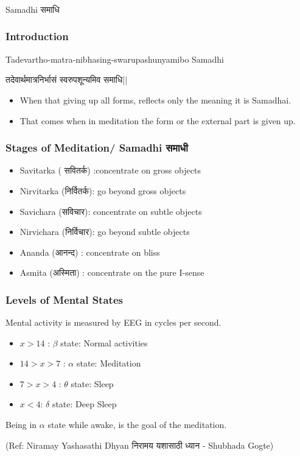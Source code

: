 \begin{frame}[fragile]\frametitle{}
\begin{center}
{\Large Samadhi समाधि}
\end{center}
\end{frame}

\begin{frame}[fragile]\frametitle{Introduction}

Tadevartho-matra-nibhasing-swarupashunyamibo Samadhi

तदेवार्थमात्रनिर्भासं स्वरुपशून्यमिव समाधि||

	\begin{itemize}
	\item When that giving up all forms, 
reflects  only  the  meaning  it  is 
Samadhai. 
	\item That comes when in 
meditation  the  form  or  the 
external part is given up.
	\end{itemize}

\end{frame}


\begin{frame}[fragile]\frametitle{Stages of Meditation/ Samadhi समाधी}


	\begin{itemize}
	\item Savitarka ( सवितर्क) :concentrate on gross objects
	\item  Nirvitarka (निर्वितर्क): go beyond gross objects
	\item  Savichara (सविचार): concentrate on subtle objects
	\item  Nirvichara (निर्विचार): go beyond subtle objects
	\item  Ananda (आनन्द) : concentrate on bliss
	\item  Asmita (अस्मिता) : concentrate on the pure I-sense
	\end{itemize}

\end{frame}

\begin{frame}[fragile]\frametitle{Levels of Mental States}
Mental activity is measured by EEG in cycles per second.

	\begin{itemize}
	\item $x > 14$ : $\beta$ state: Normal activities
	\item $ 14 > x > 7$ : $\alpha$ state: Meditation
	\item $ 7 > x > 4 $ : $\theta$ state: Sleep
	\item $ x < 4 $: $\delta$ state: Deep Sleep
	\end{itemize}

Being in $\alpha$ state while awake, is the goal of the meditation.

\tiny{(Ref: Niramay Yashasathi Dhyan निरामय यशासाठी ध्यान - Shubhada Gogte)}

\end{frame}



